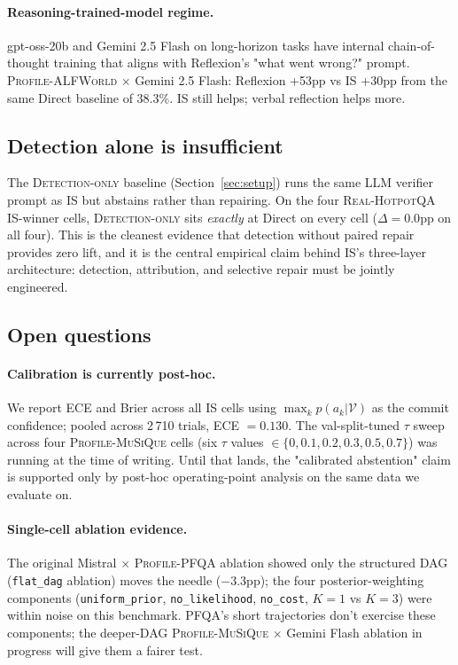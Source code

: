 \paragraph{Reasoning-trained-model regime.}
gpt-oss-20b and Gemini 2.5 Flash on long-horizon tasks have
internal chain-of-thought training that aligns with Reflexion's
"what went wrong?" prompt. \textsc{Profile-ALFWorld} $\times$
Gemini 2.5 Flash: Reflexion +53pp vs IS +30pp from the same
Direct baseline of 38.3\%. IS still helps; verbal reflection
helps more.

\subsection{Detection alone is insufficient}

The \textsc{Detection-only} baseline (Section~\ref{sec:setup})
runs the same LLM verifier prompt as IS but abstains rather than
repairing. On the four \textsc{Real-HotpotQA} IS-winner cells,
\textsc{Detection-only} sits \emph{exactly} at Direct on every
cell ($\Delta = 0.0$pp on all four). This is the cleanest
evidence that detection without paired repair provides zero
lift, and it is the central empirical claim behind IS's
three-layer architecture: detection, attribution, and selective
repair must be jointly engineered.

\subsection{Open questions}

\paragraph{Calibration is currently post-hoc.}
We report ECE and Brier across all IS cells using
$\max_k p(a_k|\mathcal{V})$ as the commit confidence; pooled across
2\,710 trials, ECE $=0.130$. The val-split-tuned $\tau$ sweep
across four \textsc{Profile-MuSiQue} cells (six $\tau$ values
$\in \{0, 0.1, 0.2, 0.3, 0.5, 0.7\}$) was running at the time of
writing. Until that lands, the "calibrated abstention" claim is
supported only by post-hoc operating-point analysis on the same
data we evaluate on.

\paragraph{Single-cell ablation evidence.}
The original Mistral $\times$ \textsc{Profile-PFQA} ablation
showed only the structured DAG (\texttt{flat\_dag} ablation) moves
the needle ($-3.3$pp); the four posterior-weighting components
(\texttt{uniform\_prior}, \texttt{no\_likelihood}, \texttt{no\_cost},
$K=1$ vs $K=3$) were within noise on this benchmark. PFQA's
short trajectories don't exercise these components; the
deeper-DAG \textsc{Profile-MuSiQue} $\times$ Gemini Flash
ablation in progress will give them a fairer test.

